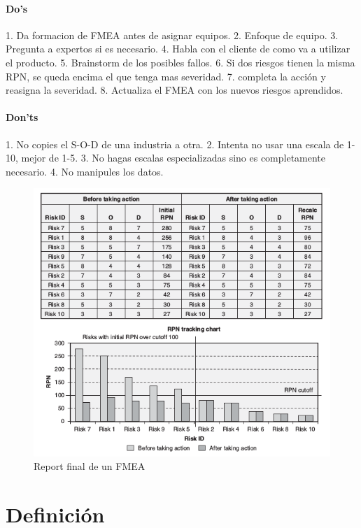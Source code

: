 \documentclass[oneside]{book}
\begin{document}
\subsection{Do's} 1. Da formacion de FMEA antes de asignar equipos. 2. Enfoque de equipo. 3. Pregunta a expertos si es necesario. 4. Habla con el cliente de como va a utilizar el producto. 5. Brainstorm de los posibles fallos. 6. Si dos riesgos tienen la misma RPN, se queda encima el que tenga mas severidad. 7. completa la acción y reasigna la severidad. 8. Actualiza el FMEA con los nuevos riesgos aprendidos.

\subsection{Don'ts} 1. No copies el S-O-D de una industria a otra. 2. Intenta no usar una escala de 1-10, mejor de 1-5. 3. No hagas escalas especializadas sino es completamente necesario. 4. No manipules los datos.

\begin{figure}[ht!]
	\centering
	\includegraphics[width=140mm]{imagenes/FMEAPrePos.png}
	\caption{Report final de un FMEA}
	\label{fig:FMEAPrePos}
\end{figure}
\pagebreak[4]
\part{Definición}
\end{document}
